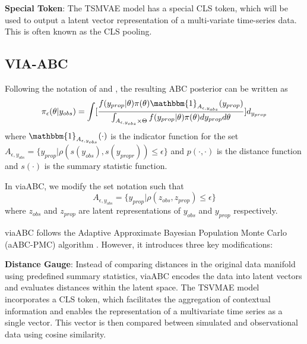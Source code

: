 \documentclass[12pt]{article} %
\begin{document}

\textbf{Special Token}: The TSMVAE model has a special CLS token, which will be used to output a latent vector representation of a multi-variate time-series data. This is often known as the CLS pooling. 



\subsection{VIA-ABC}
Following the notation of \citep{marin2012approximate} and \citep{simola2021adaptive}, the resulting ABC posterior can be written as
$$
\pi_{\epsilon}(\theta | y_{obs}) = \int [\frac{f(y_{prop} | \theta)\pi(\theta)\mathbbm{1}_{A_{\epsilon, y_{obs}}}(y_{prop})}{\int_{A_{\epsilon, y_{obs}} \times \Theta } f(y_{prop} | \theta)\pi(\theta)dy_{prop}d\theta}]d_{y_{prop}}
$$
where $\mathbbm{1}_{A_{\epsilon, y_{obs}}}(\cdot)$ is the indicator function for the set $A_{\epsilon, y_{obs}} = \{y_{prop} | \rho (s(y_{obs}), s(y_{propr})) \leq \epsilon\}$ and $p(\cdot,\cdot)$ is the distance function and $s(\cdot)$ is the summary statistic function. 

In viaABC, we modify the set notation such that
$$A_{\epsilon, y_{obs}} = \{y_{prop} | \rho (z_{obs}, z_{prop}) \leq \epsilon\}$$
where $z_{obs}$ and $z_{prop}$ are latent representations of $y_{obs}$ and $y_{prop}$ respectively.

viaABC follows the Adaptive Approximate Bayesian Population Monte Carlo (aABC-PMC) algorithm \citep{simola2021adaptive}. However, it introduces three key modifications: 

\textbf{Distance Gauge}: Instead of comparing distances in the original data manifold using predefined summary statistics, viaABC encodes the data into latent vectors and evaluates distances within the latent space. The TSVMAE model incorporates a CLS token, which facilitates the aggregation of contextual information and enables the representation of a multivariate time series as a single vector. This vector is then compared between simulated and observational data using cosine similarity.
\end{document}

